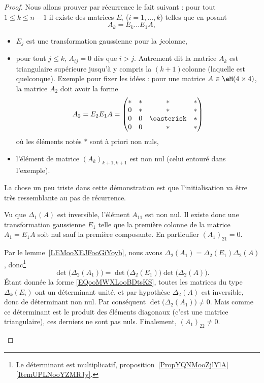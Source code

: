 \begin{proof}
	Nous allons prouver par récurrence le fait suivant : pour tout \( 1\leq k\leq n-1\) il existe des matrices \( E_i\) (\( i=1,\ldots, k\)) telles que en posant
	\begin{equation}
		A_k=E_{k}\ldots E_1A,
	\end{equation}
	\begin{itemize}
		\item \( E_j\) est une transformation gaussienne pour la \( j\)\ieme colonne,
		\item pour tout \( j\leq k\), \( A_{ij}=0\) dès que \( i>j\). Autrement dit la matrice \( A_k\) est triangulaire supérieure jusqu'à y compris la \( (k+1)\)\ieme colonne (laquelle est quelconque). Exemple pour fixer les idées : pour une matrice \( A\in \eM(4\times 4) \), la matrice \( A_2\) doit avoir la forme
		      \begin{equation}
			      A_2=E_2E_1A=\begin{pmatrix}
				      * & * & *          & * \\
				      0 & * & *          & * \\
				      0 & 0 & \oasterisk & * \\
				      0 & 0 & *          & *
			      \end{pmatrix}
		      \end{equation}
		      où les éléments notés \(*\) sont à priori non nuls,
		\item l'élément de matrice \( (A_k)_{ k+1,k+1  }  \) est non nul (celui entouré dans l'exemple).
	\end{itemize}

	La chose un peu triste dans cette démonstration est que l'initialisation va être très ressemblante au pas de récurrence.
	\begin{subproof}
		\spitem[Initialisation : \( k=1\)]

		Vu que \( \Delta_1(A)\) est inversible, l'élément \( A_{11}\) est non nul. Il existe donc une transformation gaussienne \( E_1\) telle que la première colonne de la matrice \( A_1=E_1A\) soit nul sauf la première composante. En particulier \( (A_1)_{21}=0\).

		Par le lemme~\ref{LEMooXEJFooGiYoyb}, nous avons \( \Delta_2(A_1)=\Delta_2(E_1)\Delta_2(A)\), donc\footnote{Le déterminant est multiplicatif, proposition~\ref{PropYQNMooZjlYlA}\ref{ItemUPLNooYZMRJy}.}
		\begin{equation}
			\det\big( \Delta_2(A_1) \big)=\det\big( \Delta_2(E_1) \big)\det\big( \Delta_2(A) \big).
		\end{equation}
		Étant donnée la forme \eqref{EQooMWXLooBDtsKS}, toutes les matrices du type \( \Delta_k(E_i)\) ont un déterminant unité, et par hypothèse \( \Delta_2(A)\) est inversible, donc de déterminant non nul. Par conséquent \( \det\big( \Delta_2(A_1) \big)\neq 0\). Mais comme ce déterminant est le produit des éléments diagonaux (c'est une matrice triangulaire), ces derniers ne sont pas nuls. Finalement, \( (A_1)_22\neq 0\).


\end{subproof}
\end{proof}
